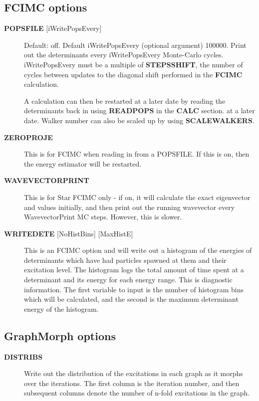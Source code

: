 \documentclass[openany,a4paper,10pt]{manual}
\begin{document}
\subsection{FCIMC options}
\begin{description}
\item[\textbf{POPSFILE} {[}iWritePopsEvery{]}]
Default: off.  Default iWritePopsEvery (optional argument) 100000.
Print out the determinants every iWritePopsEvery Monte-Carlo cycles.
iWritePopsEvery must be a multiple of \textbf{STEPSSHIFT}, the number of
cycles between updates to the diagonal shift performed in the
\textbf{FCIMC} calculation.

A calculation can then be restarted at a later date by reading the
determinants back in using \textbf{READPOPS} in the \textbf{CALC} section.
at a later date. Walker number can also be scaled up by using \textbf{SCALEWALKERS}.

\item[\textbf{ZEROPROJE}]
This is for FCIMC when reading in from a POPSFILE. If this is on, then the energy
estimator will be restarted.

\item[\textbf{WAVEVECTORPRINT}]
This is for Star FCIMC only - if on, it will calculate the exact eigenvector and
values initially, and then print out the running wavevector every
WavevectorPrint MC steps. However, this is slower.

\item[\textbf{WRITEDETE} {[}NoHistBins{]} {[}MaxHistE{]}]
This is an FCIMC option and will write out a histogram of the energies of determinants which have
had particles spawned at them and their excitation level. The histogram logs the total
amount of time spent at a determinant and its energy for each energy range. This is diagnostic
information. The first variable to input is the number of histogram bins which will be calculated,
and the second is the maximum determinant energy of the histogram.

\end{description}


\subsection{GraphMorph options}
\begin{description}
\item[\textbf{DISTRIBS}]
Write out the distribution of the excitations in each graph as it
morphs over the iterations. The first column is the iteration number, and
then subsequent columns denote the number of n-fold excitations in
the graph.

\end{description}
\end{document}
